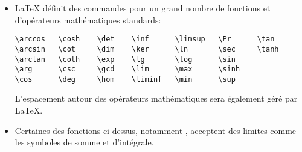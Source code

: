 \begin{itemize}
\item {\LaTeX} définit des commandes pour un grand nombre de fonctions
  et d'opérateurs mathématiques standards:
\begin{lstlisting}
\arccos   \cosh    \det    \inf      \limsup   \Pr      \tan
\arcsin   \cot     \dim    \ker      \ln       \sec     \tanh
\arctan   \coth    \exp    \lg       \log      \sin
\arg      \csc     \gcd    \lim      \max      \sinh
\cos      \deg     \hom    \liminf   \min      \sup
\end{lstlisting}
  L'espacement autour des opérateurs mathématiques sera également géré
  par {\LaTeX}.
\item Certaines des fonctions ci-dessus, notamment \cmd{\lim}, acceptent
  des limites comme les symboles de somme et d'intégrale.
\end{itemize}
